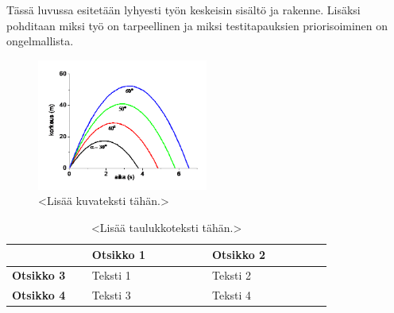 Tässä luvussa esitetään lyhyesti työn keskeisin sisältö ja rakenne.
Lisäksi pohditaan miksi työ on tarpeellinen ja miksi testitapauksien priorisoiminen on ongelmallista.

\begin{figure}[ht!]
  \centering
  \includegraphics[width=0.5\textwidth]{assets/good-example.png}
  \caption{<Lisää kuvateksti tähän.>}
  \label{fig:kuvaesimerkki}
\end{figure}

\begin{table}[ht!]
  \centering
  \caption{<Lisää taulukkoteksti tähän.>}
  \label{tab:taulukkoesimerkki}
  \begin{tabular}{p{0.2\linewidth} | p{0.3\linewidth} | p{0.3\linewidth}}
    \hline
    & \textbf{Otsikko 1} & \textbf{Otsikko 2} \\
    \hline
    \textbf{Otsikko 3} & Teksti 1 & Teksti 2\\
    \hline
    \textbf{Otsikko 4} & Teksti 3 & Teksti 4\\
    \hline
  \end{tabular}
\end{table}

\parencite{nawar_multi-heuristic_2014}

\parencite{zhang_test_2007}